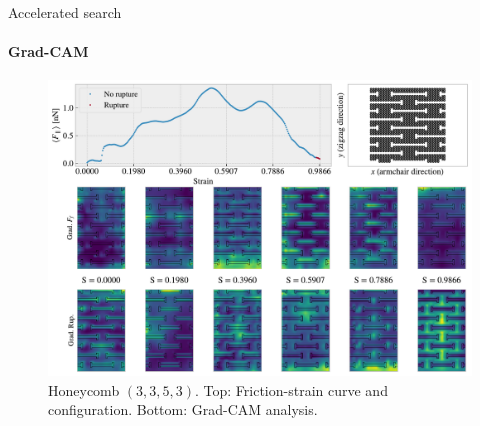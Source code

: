 \documentclass[
	10pt, %
]{beamer}
\begin{document}

%
%
%
%
\begin{frame}{Accelerated search}
	\framesubtitle{Grad-CAM}
	\begin{figure}[H]
		\centering
		\includegraphics[width=0.7\linewidth]{../thesis/figures/search/grad_cam_hon_3_3_5_3_12_0.pdf}
		\caption{Honeycomb $(3,3,5,3)$. Top: Friction-strain curve and configuration. Bottom: Grad-CAM analysis.}
	\end{figure}  
\end{frame}
%
%
\end{document}
